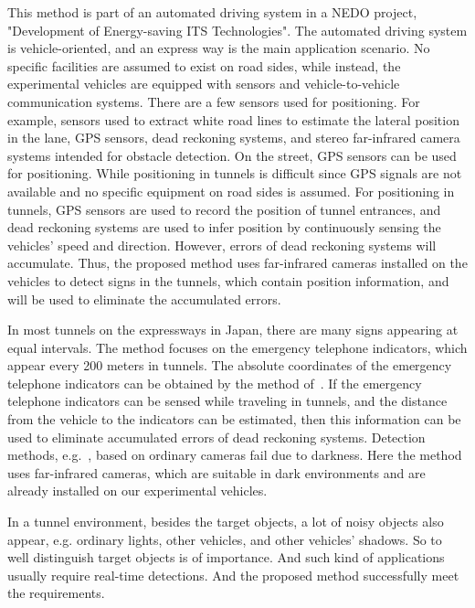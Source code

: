 This method is part of an automated driving system in a NEDO project, "Development of Energy-saving ITS Technologies".
The automated driving system is vehicle-oriented, and an express way is the main application scenario. No specific facilities are assumed to exist on road sides, while instead, the experimental vehicles are equipped with  sensors and vehicle-to-vehicle communication systems. There are a few sensors used for positioning. For example, sensors used to extract white road lines to estimate the lateral position in the lane, GPS sensors, dead reckoning systems, and stereo far-infrared camera systems intended for obstacle detection. On the street, GPS sensors can be used for positioning. While positioning in tunnels is difficult since GPS signals are not available and no specific equipment on road sides is assumed. For positioning in tunnels, GPS sensors are used to record the position of  tunnel entrances, and dead reckoning systems are used to infer position by continuously sensing the vehicles' speed and direction. However, errors of dead reckoning systems will accumulate. Thus, the proposed method uses far-infrared cameras installed on the vehicles to detect signs in the tunnels, which contain position information, and will be used to eliminate the accumulated errors.

In most tunnels   on the expressways in Japan, there are many signs appearing at equal intervals. The method focuses on the emergency telephone indicators, which appear every 200 meters in tunnels. The absolute coordinates of the emergency telephone indicators can be obtained by the method of~\citep{xue}.  If the emergency telephone indicators can be sensed while traveling in tunnels, and the distance from the vehicle to the indicators can be estimated,  then this information  can be used to eliminate accumulated errors of dead reckoning systems.
Detection methods, e.g.~\citep{ac23}, based on ordinary cameras fail due to darkness. Here the method uses far-infrared cameras,  which are suitable in dark environments and are already installed on our experimental vehicles.

 In a tunnel environment, besides the target objects, a lot of noisy objects also appear, e.g. ordinary lights, other vehicles, and other vehicles' shadows. So to well distinguish target objects is of importance. And such kind of applications usually require real-time detections. And the proposed method successfully meet the requirements.

